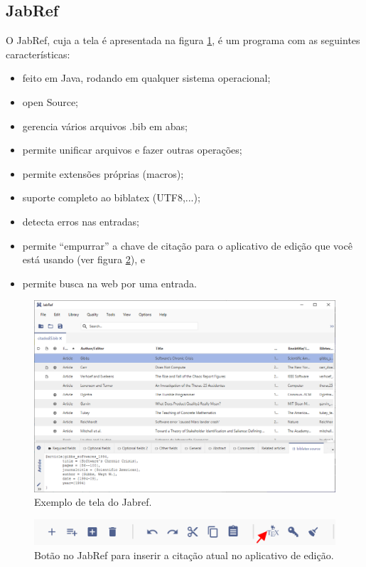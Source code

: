 \subsection{JabRef}
O JabRef, cuja a tela é apresentada na figura \ref{fig:jabref},  é um programa com as seguintes características:
\begin{itemize}
    \item feito em Java, rodando em qualquer sistema operacional;
    \item open Source;
    \item gerencia vários arquivos .bib em abas;
    \item permite unificar arquivos e fazer outras operações;
    \item permite extensões próprias (macros);
    \item suporte completo ao biblatex (UTF8,...);
    \item detecta erros nas entradas;
    \item permite \enquote{empurrar} a chave de citação para o aplicativo de edição que você está usando (ver figura \ref{fig:jabref-push}), e
    \item permite busca na web por uma entrada.
    
\end{itemize}


\begin{figure}
    \centering
    \includegraphics[width=0.7\linewidth]{Images/jabref}
    \caption{Exemplo de tela do Jabref.}
    \label{fig:jabref}
\end{figure}  

\begin{figure}
    \centering
    \includegraphics[width=0.7\linewidth]{"Images/jabref push"}
    \caption{Botão no JabRef para inserir a citação atual no aplicativo de edição.}
    \label{fig:jabref-push}
\end{figure}






